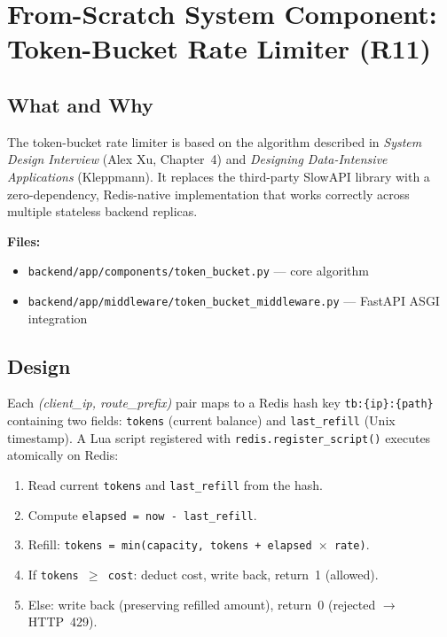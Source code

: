 \documentclass[12pt,a4paper]{article}
\begin{document}
\section{From-Scratch System Component: Token-Bucket Rate Limiter (R11)}

\subsection{What and Why}

The token-bucket rate limiter is based on the algorithm described in \textit{System Design Interview} (Alex Xu, Chapter~4) and \textit{Designing Data-Intensive Applications} (Kleppmann). It replaces the third-party SlowAPI library with a zero-dependency, Redis-native implementation that works correctly across multiple stateless backend replicas.

\textbf{Files:}
\begin{itemize}[noitemsep]
  \item \texttt{backend/app/components/token\_bucket.py} --- core algorithm
  \item \texttt{backend/app/middleware/token\_bucket\_middleware.py} --- FastAPI ASGI integration
\end{itemize}

\subsection{Design}

Each \textit{(client\_ip, route\_prefix)} pair maps to a Redis hash key \texttt{tb:\{ip\}:\{path\}} containing two fields: \texttt{tokens} (current balance) and \texttt{last\_refill} (Unix timestamp). A Lua script registered with \texttt{redis.register\_script()} executes atomically on Redis:

\begin{enumerate}[noitemsep]
  \item Read current \texttt{tokens} and \texttt{last\_refill} from the hash.
  \item Compute \texttt{elapsed = now - last\_refill}.
  \item Refill: \texttt{tokens = min(capacity,~tokens + elapsed $\times$ rate)}.
  \item If \texttt{tokens $\geq$ cost}: deduct cost, write back, return~1 (allowed).
  \item Else: write back (preserving refilled amount), return~0 (rejected $\to$ HTTP~429).
\end{enumerate}
\end{document}
